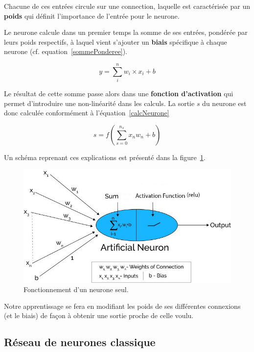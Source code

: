 Chacune de ces entrées circule sur une connection, laquelle est caractérisée par un \textbf{poids} qui définit l'importance de l'entrée pour le neurone.

Le neurone calcule dans un premier temps la somme de ses entrées, pondérée par leurs poids respectifs, à laquel vient s'ajouter un \textbf{biais} spécifique à chaque neurone (cf. equation~\ref{sommePonderee}).

\begin{equation}
\label{sommePonderee}
y = \sum_{i}^{n} w_i \times x_i + b
\end{equation}

Le résultat de cette somme passe alors dans une \textbf{fonction d'activation} qui permet d'introduire une non-linéarité dans les calculs. La sortie $s$ du neurone est donc calculée conformément à l'équation~\ref{calcNeurone}

\begin{equation}
\label{calcNeurone}
s = f(\sum_{s=0}^{n_{x}} x_{n}w_{n} + b)
\end{equation}

Un schéma reprenant ces explications est présenté dans la figure~\ref{neuroneSeul}.

\begin{figure}[h]
\includegraphics[width=16.5cm]{./images/image2.jpg}
\caption{Fonctionnement d'un neurone seul.\label{neuroneSeul}}
\end{figure}

Notre apprentissage se fera en modifiant les poids de ses différentes
connexions (et le biais) de façon à obtenir une sortie proche de celle voulu.\newline

\hypertarget{Ruxe9seau-de-neurones-classique}{%
\subsection{Réseau de neurones classique}
\label{Ruxe9seau-de-neurones-classique}}

